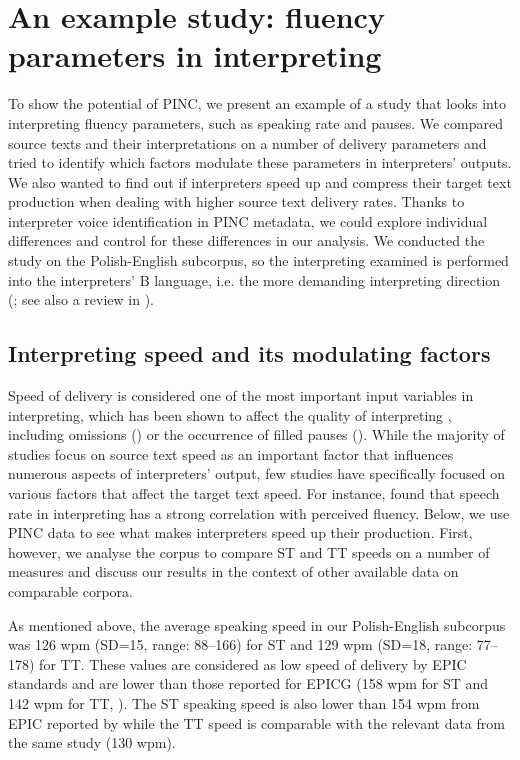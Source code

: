 \documentclass[output=paper]{langscibook}
\begin{document}
\section{An example study: fluency parameters in interpreting} \label{sec:chmiel:3}

To show the potential of PINC, we present an example of a study that looks into interpreting fluency parameters, such as speaking rate and pauses. We compared source texts and their interpretations on a number of delivery parameters and tried to identify which factors modulate these parameters in interpreters’ outputs. We also wanted to find out if interpreters speed up and compress their target text production when dealing with higher source text delivery rates. Thanks to interpreter voice identification in PINC metadata, we could explore individual differences and control for these differences in our analysis. We conducted the study on the Polish-English subcorpus, so the interpreting examined is performed into the interpreters’ B language, i.e. the more demanding interpreting direction (\citealt{Chang2005}; see also a review in \citealt{Chmiel2016}). 

\subsection{Interpreting speed and its modulating factors}\label{sec:chmiel:3.1}

Speed of delivery is considered one of the most important input variables in interpreting, which has been shown to affect the quality of interpreting \citep{Riccardi2015}, including omissions (\citealt{BarghoutEtAl2015}) or the occurrence of filled pauses (\citealt{PlevoetsDefrancq2016}). While the majority of studies focus on source text speed as an important factor that influences numerous aspects of interpreters’ output, few studies have specifically focused on various factors that affect the target text speed. For instance, \citet{Han2015} found that speech rate in interpreting has a strong correlation with perceived fluency. Below, we use PINC data to see what makes interpreters speed up their production. First, however, we analyse the corpus to compare ST and TT speeds on a number of measures and discuss our results in the context of other available data on comparable corpora.

As mentioned above, the average speaking speed in our Polish-English subcorpus was 126 wpm (SD=15, range: 88--166) for ST and 129 wpm (SD=18, range: 77--178) for TT. These values are considered as low speed of delivery by EPIC standards \citep{MontiEtAl2005} and are lower than those reported for EPICG (158 wpm for ST and 142 wpm for TT, \citealt{CollardDefrancq2019}). The ST speaking speed is also lower than 154 wpm from EPIC reported by \citet{Russo2018} while the TT speed is comparable with the relevant data from the same study (130 wpm).
\end{document}
